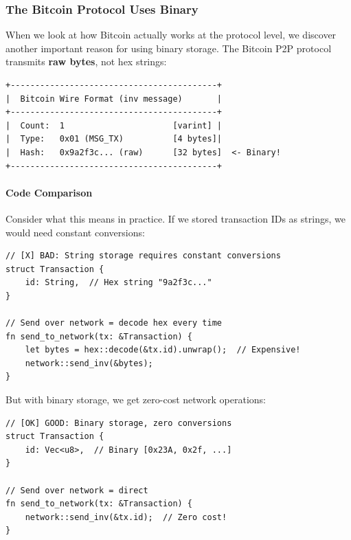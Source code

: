 \subsubsection{The Bitcoin Protocol Uses Binary}
\label{sec:ch06-bitcoin-protocol-binary}

When we look at how Bitcoin actually works at the protocol level, we discover another important reason for using binary storage. The Bitcoin P2P protocol transmits \textbf{raw bytes}, not hex strings:

\begin{verbatim}
+------------------------------------------+
|  Bitcoin Wire Format (inv message)       |
+------------------------------------------+
|  Count:  1                      [varint] |
|  Type:   0x01 (MSG_TX)          [4 bytes]|
|  Hash:   0x9a2f3c... (raw)      [32 bytes]  <- Binary!
+------------------------------------------+
\end{verbatim}

\needspace{3in}
\paragraph{Code Comparison}
Consider what this means in practice. If we stored transaction IDs as strings, we would need constant conversions:

\begin{listing}[H]
\caption{Inefficient string-based approach}
\label{lst:ch06-2}
\begin{verbatim}
// [X] BAD: String storage requires constant conversions
struct Transaction {
    id: String,  // Hex string "9a2f3c..."
}

// Send over network = decode hex every time
fn send_to_network(tx: &Transaction) {
    let bytes = hex::decode(&tx.id).unwrap();  // Expensive!
    network::send_inv(&bytes);
}
\end{verbatim}
\end{listing}

But with binary storage, we get zero-cost network operations:

\begin{listing}[H]
\caption{Efficient binary-based approach}
\label{lst:ch06-3}
\begin{verbatim}
// [OK] GOOD: Binary storage, zero conversions
struct Transaction {
    id: Vec<u8>,  // Binary [0x23A, 0x2f, ...]
}

// Send over network = direct
fn send_to_network(tx: &Transaction) {
    network::send_inv(&tx.id);  // Zero cost!
}
\end{verbatim}
\end{listing}

